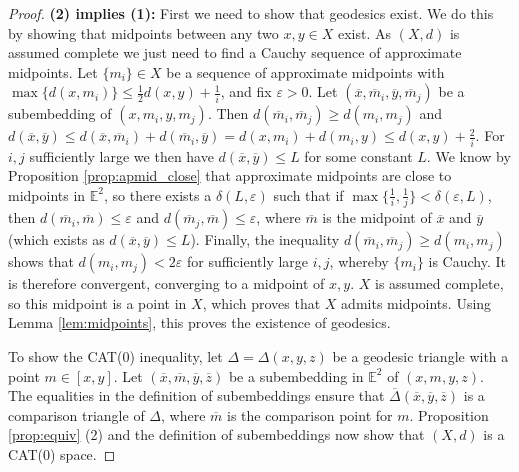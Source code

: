\documentclass[11pt, a4paper, oneside]{memoir}
\theoremstyle{plain}\newtheorem{theorem}[subsection]{Theorem}
\theoremstyle{definition}
\newcommand{\E}{\mathbb{E}}
\begin{document}
\begin{proof}
\textbf{(2) implies (1):}
First we need to show that geodesics exist.
We do this by showing that midpoints between any two \(x,y\in X\) exist.
As \((X,d)\) is assumed complete we just need to find a Cauchy sequence of approximate midpoints.
Let \(\{m_i\}\in X\) be a sequence of approximate midpoints with \(\max\{d(x,m_i)\}\leq\frac{1}{2}d(x,y)+\frac{1}{i}\), and fix \(\varepsilon>0\).
Let \((\overline{x},\overline{m}_i,\overline{y},\overline{m}_j)\) be a subembedding of \((x,m_i,y,m_j)\).
Then \(d(\overline{m}_i,\overline{m}_j)\geq d(m_i,m_j)\) and \(d(\overline{x},\overline{y})\leq d(\overline{x},\overline{m}_i)+d(\overline{m}_i,\overline{y})=d(x,m_i)+d(m_i,y)\leq d(x,y)+\frac{2}{i}\).
For \(i,j\) sufficiently large we then have \(d(\overline{x},\overline{y})\leq L\) for some constant \(L\).
We know by Proposition \ref{prop:apmid_close} that approximate midpoints are close to midpoints in \(\E^2\), so there exists a \(\delta(L,\varepsilon)\) such that if \(\max\{\frac{1}{i},\frac{1}{j}\}<\delta(\varepsilon,L)\), then \(d(\overline{m}_i,\overline{m})\leq\varepsilon\) and \(d(\overline{m}_j,\overline{m})\leq\varepsilon\), where \(\overline{m}\) is the midpoint of \(\overline{x}\) and \(\overline{y}\) (which exists as \(d(\overline{x},\overline{y})\leq L\)).
Finally, the inequality \(d(\overline{m}_i,\overline{m}_j)\geq d(m_i,m_j)\) shows that \(d(m_i,m_j)<2\varepsilon\) for sufficiently large \(i,j\), whereby \(\{m_i\}\) is Cauchy.
It is therefore convergent, converging to a midpoint of \(x,y\).
\(X\) is assumed complete, so this midpoint is a point in \(X\), which proves that \(X\) admits midpoints.
Using Lemma \ref{lem:midpoints}, this proves the existence of geodesics.

To show the CAT(0) inequality, let \(\Delta=\Delta(x,y,z)\) be a geodesic triangle with a point \(m\in [x,y]\).
Let \((\overline{x},\overline{m},\overline{y},\overline{z})\) be a subembedding in \(\E^2\) of \((x,m,y,z)\).
The equalities in the definition of subembeddings ensure that \(\overline{\Delta}(\overline{x},\overline{y},\overline{z})\) is a comparison triangle of \(\Delta\), where \(\overline{m}\) is the comparison point for \(m\).
Proposition \ref{prop:equiv} (2) and the definition of subembeddings now show that \((X,d)\) is a CAT(0) space.
\end{proof}




\end{document}
